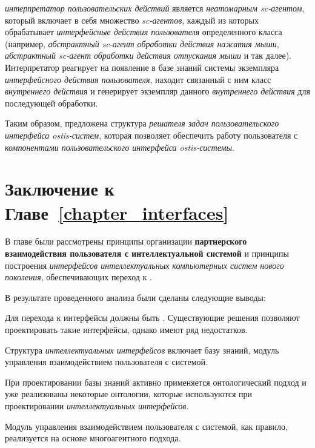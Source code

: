 \textit{интерпретатор пользовательских действий} является \textit{неатомарным sc-агентом}, который включает в себя множество \textit{sc-агентов}, каждый из которых обрабатывает \textit{интерфейсные действия пользователя} определенного класса (например, \textit{абстрактный sc-агент обработки действия нажатия мыши}, \textit{абстрактный sc-агент обработки действия отпускания мыши} и так далее). Интерпретатор реагирует на появление в базе знаний системы экземпляра \textit{интерфейсного действия пользователя}, находит связанный с ним класс \textit{внутреннего действия} и генерирует экземпляр данного \textit{внутреннего действия} для последующей обработки.

Таким образом, предложена структура \textit{решателя задач пользовательского интерфейса ostis-систем}, которая позволяет обеспечить работу пользователя с \textit{компонентами пользовательского интерфейса ostis-системы}.

\section*{Заключение к Главе~\ref{chapter_interfaces}}

В главе были рассмотрены принципы организации \textbf{партнерского взаимодействия пользователя с интеллектуальной системой} и принципы построения \textit{интерфейсов интеллектуальных компьютерных систем нового поколения}, обеспечивающих переход к .

В результате проведенного анализа были сделаны следующие выводы:
\begin{textitemize}
	\item Для перехода к  интерфейсы должны быть . Существующие решения позволяют проектировать такие интерфейсы, однако имеют ряд недостатков.
	\item Структура \textit{интеллектуальных интерфейсов} включает базу знаний, модуль управления взаимодействием пользователя с системой.
	\item При проектировании базы знаний активно применяется онтологический подход и уже реализованы некоторые онтологии, которые используются при проектировании \textit{интеллектуальных интерфейсов}.
	\item Модуль управления взаимодействием пользователя с системой, как правило, реализуется на основе многоагентного подхода.
\end{textitemize} 


